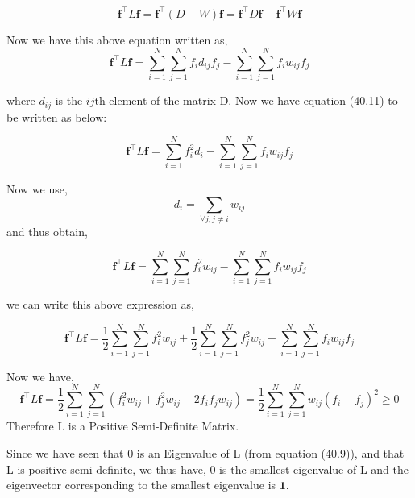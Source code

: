 \documentclass[english]{article}
\renewcommand{\geq}{\geqslant}
\theoremstyle{plain}
\begin{document}
\begin{equation}
\boldsymbol{f}^{\top}L\boldsymbol{f} = \boldsymbol{f}^{\top}(D-W)\boldsymbol{f}=
\boldsymbol{f}^{\top}D\boldsymbol{f} - \boldsymbol{f}^{\top}W\boldsymbol{f}
\end{equation}

Now we have this above equation written as,
\begin{equation}
\boldsymbol{f}^{\top}L\boldsymbol{f} = 
\sum_{i=1}^{N} \sum_{j=1}^{N} f_{i} d_{ij} f_{j}
- \sum_{i=1}^{N} \sum_{j=1}^{N} f_{i} w_{ij} f_{j}
\end{equation}

where $d_{ij}$ is the $ij$th element of the matrix D. 
Now we have equation (40.11) to be written as below:

\begin{equation}
\boldsymbol{f}^{\top}L\boldsymbol{f} = 
\sum_{i=1}^{N} f^{2}_{i} d_{i}
- \sum_{i=1}^{N} \sum_{j=1}^{N} f_{i} w_{ij} f_{j}
\end{equation}

Now we use,
\begin{equation}
 d_{i} = \sum_{\forall j, j\neq i} w_{ij} \end{equation}
 and thus obtain,
 
 \begin{equation}
\boldsymbol{f}^{\top}L\boldsymbol{f} = 
\sum_{i=1}^{N} \sum_{j=1}^{N} f^{2}_{i} w_{ij}
- \sum_{i=1}^{N} \sum_{j=1}^{N} f_{i} w_{ij} f_{j}
\end{equation}

we can write this above expression as,

  \begin{equation}
\boldsymbol{f}^{\top}L\boldsymbol{f} = 
\frac{1}{2}\sum_{i=1}^{N} \sum_{j=1}^{N} f^{2}_{i} w_{ij} + \frac{1}{2}\sum_{i=1}^{N} \sum_{j=1}^{N} f^{2}_{j} w_{ij}
- \sum_{i=1}^{N} \sum_{j=1}^{N} f_{i} w_{ij} f_{j}
\end{equation}

Now we have,
\begin{equation}
\boldsymbol{f}^{\top}L\boldsymbol{f} = 
\frac{1}{2}\sum_{i=1}^{N} \sum_{j=1}^{N} \left( f^{2}_{i} w_{ij} + f^{2}_{j} w_{ij} - 2f_{i}f_{j} w_{ij} \right) = \frac{1}{2}\sum_{i=1}^{N} \sum_{j=1}^{N}  w_{ij}\left( f_{i} - f_{j} \right)^{2} \geq 0  
\end{equation}
Therefore L is a Positive Semi-Definite Matrix.

Since we have seen that 0 is an Eigenvalue of L (from equation (40.9)), and that L is positive semi-definite, we thus have, 0 is the smallest eigenvalue of L and the eigenvector corresponding to the smallest eigenvalue is $\boldsymbol{1}$.
\end{document}
